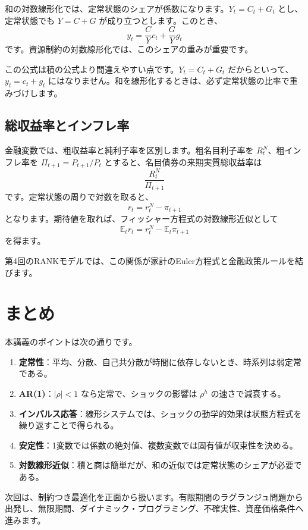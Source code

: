 \documentclass[
  japanese,
  lualatex,
  ja=standard,
  12pt,
  a4paper]{ltjsarticle}
\providecommand{\tightlist}{%
  \setlength{\itemsep}{0pt}\setlength{\parskip}{0pt}}
\begin{document}
和の対数線形化では、定常状態のシェアが係数になります。\(Y_t=C_t+G_t\)
とし、定常状態でも \(Y=C+G\) が成り立つとします。このとき、 \[
y_t
=
\frac{C}{Y}c_t+\frac{G}{Y}g_t
\] です。資源制約の対数線形化では、このシェアの重みが重要です。

この公式は積の公式より間違えやすい点です。\(Y_t=C_t+G_t\)
だからといって、\(y_t=c_t+g_t\)
にはなりません。和を線形化するときは、必ず定常状態の比率で重みづけします。

\subsection{総収益率とインフレ率}\label{ux7dcfux53ceux76caux7387ux3068ux30a4ux30f3ux30d5ux30ecux7387}

金融変数では、粗収益率と純利子率を区別します。粗名目利子率を
\(R_t^N\)、粗インフレ率を \(\Pi_{t+1}=P_{t+1}/P_t\)
とすると、名目債券の来期実質総収益率は \[
\frac{R_t^N}{\Pi_{t+1}}
\] です。定常状態の周りで対数を取ると、 \[
r_t
=
r_t^N-\pi_{t+1}
\] となります。期待値を取れば、フィッシャー方程式の対数線形近似として \[
\mathbb{E}_t r_t
=
r_t^N-\mathbb{E}_t\pi_{t+1}
\] を得ます。

第4回のRANKモデルでは、この関係が家計のEuler方程式と金融政策ルールを結びます。

\section{まとめ}\label{ux307eux3068ux3081}

本講義のポイントは次の通りです。

\begin{enumerate}
\def\labelenumi{\arabic{enumi}.}
\tightlist
\item
  \textbf{定常性}：平均、分散、自己共分散が時間に依存しないとき、時系列は弱定常である。
\item
  \textbf{AR(1)}：\(|\rho|<1\) なら定常で、ショックの影響は \(\rho^h\)
  の速さで減衰する。
\item
  \textbf{インパルス応答}：線形システムでは、ショックの動学的効果は状態方程式を繰り返すことで得られる。
\item
  \textbf{安定性}：1変数では係数の絶対値、複数変数では固有値が収束性を決める。
\item
  \textbf{対数線形近似}：積と商は簡単だが、和の近似では定常状態のシェアが必要である。
\end{enumerate}

次回は、制約つき最適化を正面から扱います。有限期間のラグランジュ問題から出発し、無限期間、ダイナミック・プログラミング、不確実性、資産価格条件へ進みます。
\end{document}
